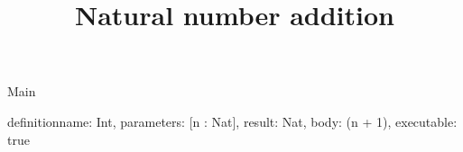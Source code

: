 \begin{lexlean}{Main}
\title{Natural number addition}
\begin{semanticmodule}
definition{name: Int, parameters: [n : Nat], result: Nat, body: (n + 1), executable: true}
\end{semanticmodule}
\end{lexlean}
